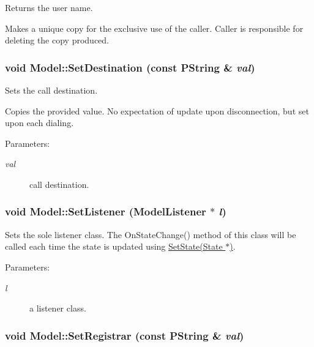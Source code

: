 Returns the user name. 

Makes a unique copy for the exclusive use of the caller. Caller is responsible for deleting the copy produced. \hypertarget{classModel_e9a19897ea5d7d2417085a5d3a2a2f72}{
\subsubsection[{SetDestination}]{\setlength{\rightskip}{0pt plus 5cm}void Model::SetDestination (const PString \& {\em val})}}
\label{classModel_e9a19897ea5d7d2417085a5d3a2a2f72}


Sets the call destination. 

Copies the provided value. No expectation of update upon disconnection, but set upon each dialing. \begin{Desc}
\item[Parameters:]
\begin{description}
\item[{\em val}]call destination. \end{description}
\end{Desc}
\hypertarget{classModel_dca495055a5153c982891398d016e22d}{
\subsubsection[{SetListener}]{\setlength{\rightskip}{0pt plus 5cm}void Model::SetListener ({\bf ModelListener} $\ast$ {\em l})}}
\label{classModel_dca495055a5153c982891398d016e22d}


Sets the sole listener class. The OnStateChange() method of this class will be called each time the state is updated using \hyperlink{classModel_8b2d324213cf67b2e139144a25c6e3c3}{SetState(State $\ast$)}.  \begin{Desc}
\item[Parameters:]
\begin{description}
\item[{\em l}]a listener class. \end{description}
\end{Desc}
\hypertarget{classModel_437d34289432b9687d0bc2f65d89aa4f}{
\subsubsection[{SetRegistrar}]{\setlength{\rightskip}{0pt plus 5cm}void Model::SetRegistrar (const PString \& {\em val})}}
\label{classModel_437d34289432b9687d0bc2f65d89aa4f}


